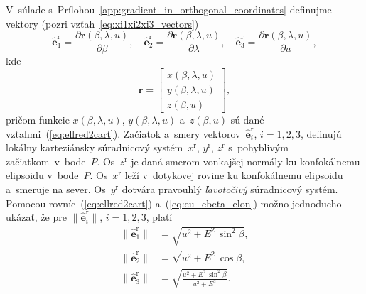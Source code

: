 \documentclass[a4paper,12pt]{book}
\let\vec\mathbf
\begin{document}
V~súlade s~Prílohou~\ref{app:gradient_in_orthogonal_coordinates} definujme 
vektory (pozri vzťah~\ref{eq:xi1xi2xi3_vectors})
%
\begin{equation}
\label{eq:eu_ebeta_elon}
\hat{\vec e}_1^\mathrm{r} = \frac{\partial \vec r(\beta, \lambda, u)}{\partial 
\beta}{,}
%
\quad
%
\hat{\vec e}_2^\mathrm{r} = \frac{\partial \vec r(\beta, \lambda, u)}{\partial 
\lambda}{,}
%
\quad
%
\hat{\vec e}_3^\mathrm{r} = \frac{\partial \vec r(\beta, \lambda, u)}{\partial 
u}{,}
%
\end{equation}
%
kde
%
\begin{equation}
\vec r =
%
\begin{bmatrix}
x(\beta, \lambda, u)\\
y(\beta, \lambda, u)\\
z(\beta, u)
\end{bmatrix}
{,}
%
\end{equation}
%
pričom funkcie $x(\beta, \lambda, u)$, $y(\beta, \lambda, u)$ a~$z(\beta, u)$ 
sú dané vzťahmi~(\ref{eq:ellred2cart}).  Začiatok a~smery vektorov~$\hat{\vec 
e}_i^\mathrm{r}$, $i = 1, 2, 3$, definujú lokálny karteziánsky súradnicový 
systém~$x^\mathrm{r}$, $y^\mathrm{r}$, $z^\mathrm{r}$ s~pohyblivým 
začiatkom~v~bode~$P$.  Os~$z^\mathrm{r}$ je daná smerom vonkajšej normály ku 
konfokálnemu elipsoidu v~bode~$P$.  Os~$x^\mathrm{r}$ leží v~dotykovej rovine 
ku konfokálnemu elipsoidu a~smeruje na sever.  Os~$y^\mathrm{r}$ dotvára 
pravouhlý \emph{ľavotočivý} súradnicový systém.
%
Pomocou rovníc~(\ref{eq:ellred2cart}) a~(\ref{eq:eu_ebeta_elon}) možno 
jednoducho ukázať, že pre $\| \hat{\vec e}_i^\mathrm{r} \|$, $i = 1, 2, 3$, 
platí
%
\begin{equation}
\label{eq:ei_reduced_ell_magnitudes}
\begin{split}
\| \hat{\vec e}_1^\mathrm{r} \| &= \sqrt{u^2 + E^2 \, \sin^2\beta}{,}\\
%
\| \hat{\vec e}_2^\mathrm{r} \| &= \sqrt{ u^2 + E^2} \, \cos\beta{,}\\
%
\| \hat{\vec e}_3^\mathrm{r} \| &= \sqrt{\frac{u^2 + E^2 \, \sin^2\beta}{u^2 
+ E^2}}{.}
\end{split}
\end{equation}
\end{document}
